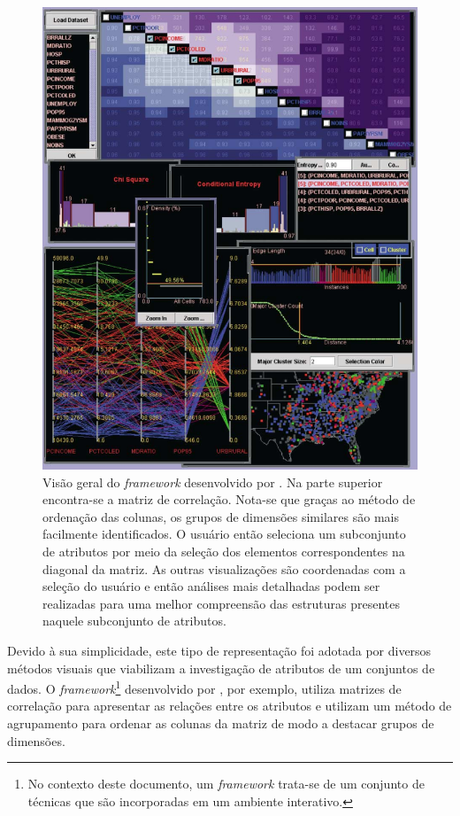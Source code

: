 \begin{figure}[h!]
    \centering
    \includegraphics[width=12cm]{images/coord.png}
    \caption[Ferramenta proposta por \cite{Guo2003}]
    {Visão geral do \emph{framework} desenvolvido por
    \cite{Guo2003}. Na parte superior encontra-se a matriz
de correlação. Nota-se que graças ao método de ordenação das
colunas, os grupos de dimensões similares são mais
facilmente identificados. O usuário então seleciona um
subconjunto de atributos por meio da seleção dos elementos
correspondentes na diagonal da matriz. As outras
visualizações são coordenadas com a seleção do usuário e
então análises mais detalhadas podem ser realizadas para uma
melhor compreensão das estruturas presentes naquele
subconjunto de atributos.} 
    \label{fig:coord}
\end{figure}

Devido à sua simplicidade, este tipo de representação foi
adotada por diversos métodos visuais que viabilizam a
investigação de atributos de um conjuntos de dados. O
\emph{framework}\footnote{No contexto deste documento, um
\emph{framework} trata-se de um conjunto de técnicas que são
incorporadas em um ambiente interativo.} desenvolvido por
\cite{Guo2003}, por exemplo, utiliza matrizes de correlação
para apresentar as relações entre os atributos e utilizam um
método de agrupamento para ordenar as colunas da matriz de
modo a destacar grupos de dimensões.

